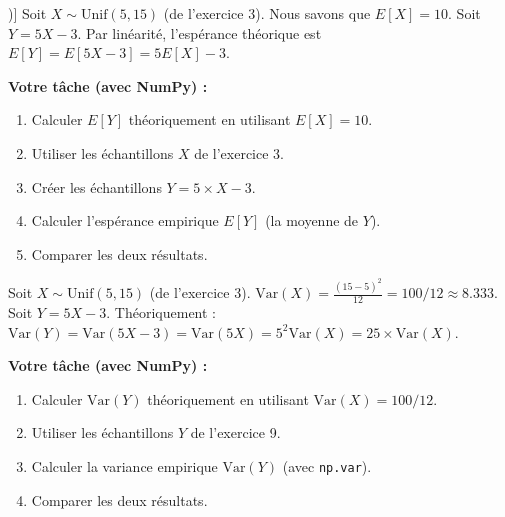 \begin{exercicebox}[Exercice 9 : Linéarité de l'Espérance (E[aX+b])]
Soit $X \sim \text{Unif}(5, 15)$ (de l'exercice 3). Nous savons que $E[X] = 10$.
Soit $Y = 5X - 3$.
Par linéarité, l'espérance théorique est $E[Y] = E[5X - 3] = 5E[X] - 3$.

\textbf{Votre tâche (avec NumPy) :}
\begin{enumerate}
    \item Calculer $E[Y]$ théoriquement en utilisant $E[X] = 10$.
    \item Utiliser les échantillons $X$ de l'exercice 3.
    \item Créer les échantillons $Y = 5 \times X - 3$.
    \item Calculer l'espérance empirique $E[Y]$ (la moyenne de $Y$).
    \item Comparer les deux résultats.
\end{enumerate}
\end{exercicebox}

\begin{exercicebox}
Soit $X \sim \text{Unif}(5, 15)$ (de l'exercice 3). $\text{Var}(X) = \frac{(15-5)^2}{12} = 100/12 \approx 8.333$.
Soit $Y = 5X - 3$.
Théoriquement : $\text{Var}(Y) = \text{Var}(5X - 3) = \text{Var}(5X) = 5^2 \text{Var}(X) = 25 \times \text{Var}(X)$.

\textbf{Votre tâche (avec NumPy) :}
\begin{enumerate}
    \item Calculer $\text{Var}(Y)$ théoriquement en utilisant $\text{Var}(X) = 100/12$.
    \item Utiliser les échantillons $Y$ de l'exercice 9.
    \item Calculer la variance empirique $\text{Var}(Y)$ (avec \texttt{np.var}).
    \item Comparer les deux résultats.
\end{enumerate}
\end{exercicebox}